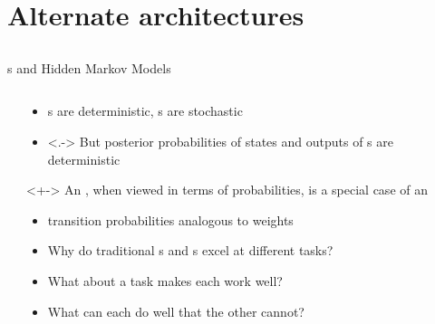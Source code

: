 \section{Alternate architectures}
\subsection{}

\begin{frame}{\rnn{}s and Hidden Markov Models}
    \begin{columns}
        \begin{column}{0.46\textwidth}
            
        \end{column}
        \begin{column}{0.54\textwidth}
            \begin{itemize}
                \item<+-> \rnn{}s are deterministic, \hmm{}s are stochastic
                \item<.-> But posterior probabilities of states and outputs of \hmm{}s are deterministic
            \end{itemize}
            \begin{block}{}<+->
                An \hmm{}, when viewed in terms of probabilities, is a special case of an \rnn{}
            \end{block}
            \begin{itemize}[<.->]
                \item \hmm{} transition probabilities analogous to \rnn{} weights
                \item<+-> Why do traditional \rnn{}s and \hmm{}s excel at different tasks?
                \item What about a task makes each work well?
                \item What can each do well that the other cannot?
            \end{itemize}
        \end{column}
    \end{columns}
\end{frame}

